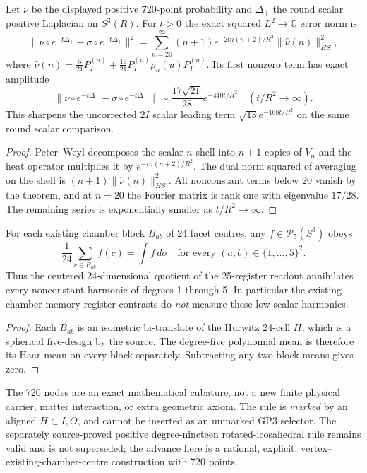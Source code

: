 \documentclass[11pt]{article}
\begin{document}
\begin{corollary}
\label{p1b:cor:cc17-720-heat-error}
Let $\nu$ be the displayed positive 720-point probability and
$\Delta_+$ the round scalar positive Laplacian on $S^3(R)$.
For $t>0$ the exact squared $L^2\to\mathbb C$ error norm is
\[
 \boxed{\|\nu\circ e^{-t\Delta_+}-\sigma\circ e^{-t\Delta_+}\|^2
 =\sum_{n=20}^\infty(n+1)e^{-2tn(n+2)/R^2}
       \|\widehat\nu(n)\|_{HS}^2,}
\]
where $\widehat\nu(n)=\frac5{21}P_I^{(n)}+
 \frac{16}{21}P_I^{(n)}\rho_n(u)P_I^{(n)}$.
Its first nonzero term has exact amplitude
\[
\boxed{\|\nu\circ e^{-t\Delta_+}-\sigma\circ e^{-t\Delta_+}\|
 \sim\frac{17\sqrt{21}}{28}e^{-440t/R^2}
 \quad(t/R^2\to\infty).}
\]
This sharpens the uncorrected $2I$ scalar leading term
$\sqrt{13}e^{-168t/R^2}$ on the same round scalar comparison.
\end{corollary}
\begin{proof}
Peter--Weyl decomposes the scalar $n$-shell into $n+1$ copies of
$V_n$ and the heat operator multiplies it by
$e^{-tn(n+2)/R^2}$. The dual norm squared of averaging on the
shell is $(n+1)\|\widehat\nu(n)\|_{HS}^2$.
All nonconstant terms below 20 vanish by the theorem, and at
$n=20$ the Fourier matrix is rank one with eigenvalue $17/28$.
The remaining series is exponentially smaller as $t/R^2\to\infty$.
\end{proof}

\begin{corollary}
\label{p1b:cor:cc17-register-lowband-blindness}
For each existing chamber block $B_{ab}$ of 24 facet centres, any
$f\in\mathcal P_5(S^3)$ obeys
\[
\boxed{\frac1{24}\sum_{c\in B_{ab}} f(c)=\int f\,d\sigma
\quad\text{for every }(a,b)\in\{1,\ldots,5\}^2.}
\]
Thus the centered 24-dimensional quotient of the 25-register readout
annihilates every nonconstant harmonic of degrees 1 through 5.
In particular the existing chamber-memory register contrasts do
\emph{not} measure these low scalar harmonics.
\end{corollary}
\begin{proof}
Each $B_{ab}$ is an isometric bi-translate of the Hurwitz
24-cell $H$, which is a spherical five-design by the source.
The degree-five polynomial mean is therefore its Haar mean on every
block separately. Subtracting any two block means gives zero.
\end{proof}

\begin{remark}
The 720 nodes are an exact mathematical cubature, not a new finite
physical carrier, matter interaction, or extra geometric axiom.
The rule is \emph{marked} by an aligned $H\subset I,O$, and cannot be
inserted as an unmarked GP3 selector. The separately source-proved
positive degree-nineteen rotated-icosahedral rule remains valid and
is not superseded; the advance here is a rational, explicit,
vertex--existing-chamber-centre construction with 720 points.
\end{remark}
\end{document}
